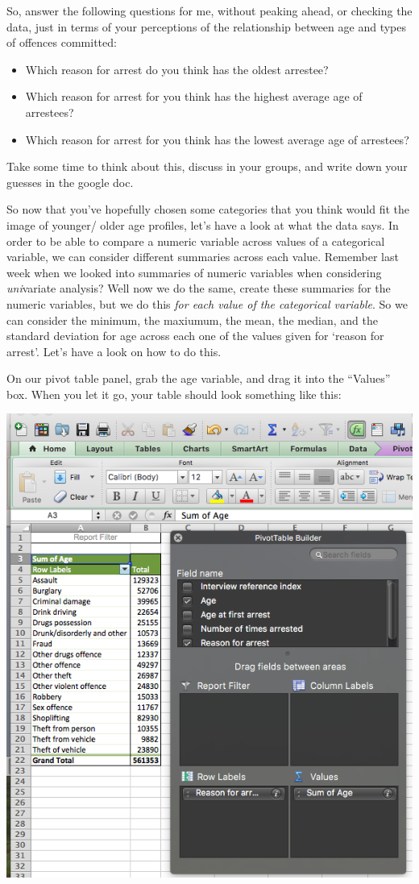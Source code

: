 \documentclass[
]{book}
\providecommand{\tightlist}{%
  \setlength{\itemsep}{0pt}\setlength{\parskip}{0pt}}
\begin{document}
So, answer the following questions for me, without peaking ahead, or checking the data, just in terms of your perceptions of the relationship between age and types of offences committed:

\begin{itemize}
\tightlist
\item
  Which reason for arrest do you think has the oldest arrestee?
\item
  Which reason for arrest for you think has the highest average age of arrestees?
\item
  Which reason for arrest for you think has the lowest average age of arrestees?
\end{itemize}

Take some time to think about this, discuss in your groups, and write down your guesses in the google doc.

So now that you've hopefully chosen some categories that you think would fit the image of younger/ older age profiles, let's have a look at what the data says. In order to be able to compare a numeric variable across values of a categorical variable, we can consider different summaries across each value. Remember last week when we looked into summaries of numeric variables when considering \emph{uni}variate analysis? Well now we do the same, create these summaries for the numeric variables, but we do this \emph{for each value of the categorical variable}. So we can consider the minimum, the maxiumum, the mean, the median, and the standard deviation for age across each one of the values given for `reason for arrest'. Let's have a look on how to do this.

On our pivot table panel, grab the age variable, and drag it into the ``Values'' box. When you let it go, your table should look something like this:

\includegraphics{imgs/age_to_value.png}
\end{document}
